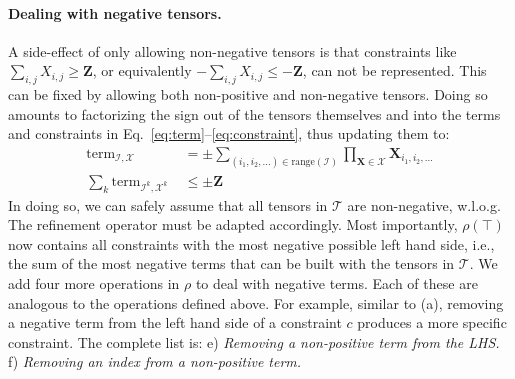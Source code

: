 \documentclass{article}
\newcommand{\luc}[1]{{\bf \textcolor{red}{{Luc: #1}}}}
\newcommand{\tensors}{\ensuremath{\mathcal{T}}\xspace}
\newcommand{\indices}{\ensuremath{\mathcal{I}}\xspace}
\newcommand{\factors}{\ensuremath{\mathcal{X}}\xspace}
\newcommand{\TERM}[2]{\ensuremath{\mathrm{term}_{#1,#2}}\xspace}
\newcommand{\RAN}[1]{\ensuremath{\mathrm{range}\left(#1\right)}\xspace}
\renewcommand\[{\begin{equation}}
\renewcommand\]{\end{equation}}
\newcommand{\TN}{\textbf{N}\xspace}
\newcommand{\TX}{\textbf{X}\xspace}
\newcommand{\TZ}{\textbf{Z}\xspace}
\begin{document}
\paragraph{Dealing with negative tensors.}  A side-effect of only allowing
non-negative tensors is that constraints like $\sum_{i,j} X_{i,j} \ge \TZ$, or
equivalently $-\sum_{i,j} X_{i,j} \le -\TZ$, can not be represented.  This can
be fixed by allowing both non-positive and non-negative tensors.  Doing so
amounts to factorizing the sign out of the tensors themselves and into the
terms and constraints in Eq.~\ref{eq:term}--\ref{eq:constraint}, thus updating
them to:
%
\begin{align*}
    \textstyle
    \TERM{\indices}{\factors}
        & \; \textstyle = \pm \sum_{(i_1, i_2, \ldots) \in \RAN{\indices}} \prod_{\TX \in \factors} \TX_{i_1, i_2, \ldots}
    \\
    \textstyle
    \sum_k \TERM{\indices^k}{\factors^k}
        & \; \textstyle \le \pm \TZ
\end{align*}
%
In doing so, we can safely assume that all tensors in $\tensors$ are
non-negative, w.l.o.g.
%
The refinement operator must be adapted accordingly.  Most importantly,
$\rho(\top)$ now contains all constraints with the most negative possible left
hand side, i.e., the sum of the most negative terms that can be built with the
tensors in $\tensors$.
%
We add four more operations in $\rho$ to deal with negative terms. Each of
these are analogous to the operations defined above. For example, similar to
(a), removing a negative term from the left hand side of a constraint $c$
produces a more specific constraint.  The complete list is:
e) \emph{Removing a non-positive term from the LHS.}
f) \emph{Removing an index from a non-positive term.}
\end{document}
